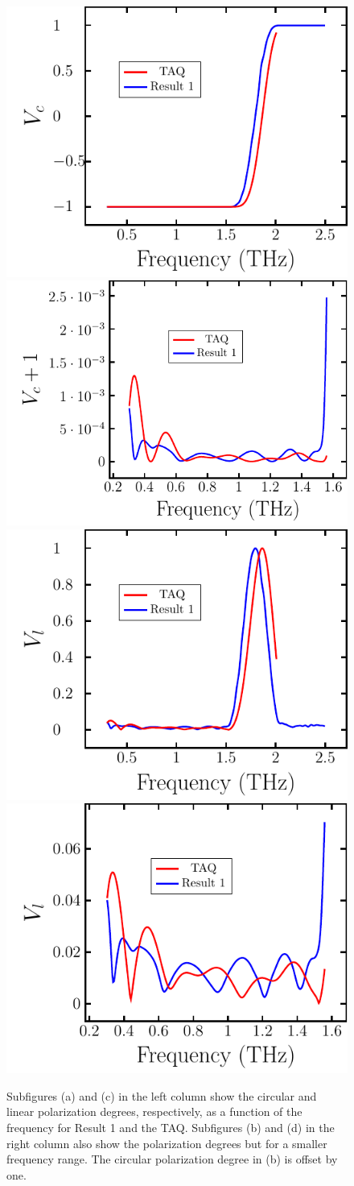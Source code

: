 \begin{figure}[H]
\centering
\subcaptionbox{\label{fig:cl4_pol_deg_a}}
    {\hspace*{-2em}\includegraphics[width=0.41\linewidth]{images/results/plots/ceramic/polDeg/degCirc.pdf}}
\qquad
\subcaptionbox{\label{fig:cl4_pol_deg_b}}
    {\hspace*{-2em}\includegraphics[width=0.45\linewidth]{images/results/plots/ceramic/polDeg/degCircZoom.pdf}}
\subcaptionbox{\label{fig:cl4_pol_deg_c}}
    {\hspace*{-2em}\includegraphics[width=0.41\linewidth]{images/results/plots/ceramic/polDeg/degLin.pdf}}
\qquad
\subcaptionbox{\label{fig:cl4_pol_deg_d}}
    {\hspace*{-2em}\includegraphics[width=0.44\linewidth]{images/results/plots/ceramic/polDeg/degLinZoom.pdf}}
\caption{Subfigures (a) and (c) in the left column show the circular and linear polarization degrees, respectively, as a function of the frequency for Result 1 and the TAQ. Subfigures (b) and (d) in the right column also show the polarization degrees but for a smaller frequency range. The circular polarization degree in (b) is offset by one.}
\label{fig:cl4_pol_deg}
\end{figure}


